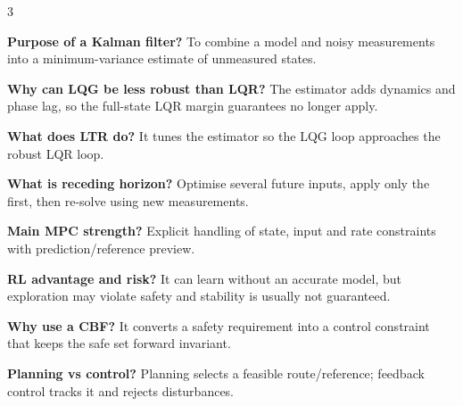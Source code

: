 \documentclass[a4paper,8pt]{extarticle}
\newcommand{\topicdot}[1]{\tikz[baseline=-0.6ex]\fill[#1] (0,0) circle (0.52ex);}
\newcommand{\Edot}{\topicdot{examDot}}
\newcommand{\mybox}[2]{
\begin{tcolorbox}[
  enhanced,
  colback=lightblue!7!white,
  colframe=lightblue!78!black,
  boxrule=0.38pt,
  boxsep=0.7pt,
  left=1.7pt,right=1.7pt,top=1.5pt,bottom=1.5pt,
  arc=0.8pt,outer arc=0.8pt,
  title={\small\textbf{#1}},
  fonttitle=\bfseries,
  coltitle=black,
  before skip=1.5pt,after skip=1.5pt,
  fontupper=\fontsize{5.55pt}{6.30pt}\selectfont\RaggedRight
]
#2
\end{tcolorbox}}
\newcommand{\qrow}[2]{%
\textbf{#1} #2\par}
\begin{document}
\begin{multicols}{3}

\mybox{Week 3 High-Probability Answers \Edot}{
\qrow{Purpose of a Kalman filter?}{To combine a model and noisy measurements into a minimum-variance estimate of unmeasured states.}
\qrow{Why can LQG be less robust than LQR?}{The estimator adds dynamics and phase lag, so the full-state LQR margin guarantees no longer apply.}
\qrow{What does LTR do?}{It tunes the estimator so the LQG loop approaches the robust LQR loop.}
\qrow{What is receding horizon?}{Optimise several future inputs, apply only the first, then re-solve using new measurements.}
\qrow{Main MPC strength?}{Explicit handling of state, input and rate constraints with prediction/reference preview.}
\qrow{RL advantage and risk?}{It can learn without an accurate model, but exploration may violate safety and stability is usually not guaranteed.}
\qrow{Why use a CBF?}{It converts a safety requirement into a control constraint that keeps the safe set forward invariant.}
\qrow{Planning vs control?}{Planning selects a feasible route/reference; feedback control tracks it and rejects disturbances.}
}

\end{multicols}
\end{document}
